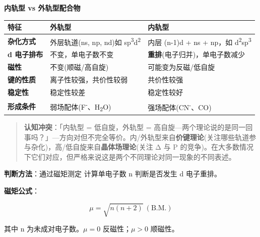 \textbf{内轨型 vs 外轨型配合物}

{\def\LTcaptype{none} %
\begin{longtable}[]{@{}
  >{\raggedright\arraybackslash}p{}
  >{\raggedright\arraybackslash}p{}
  >{\raggedright\arraybackslash}p{}@{}}
\toprule\noalign{}
\begin{minipage}[b]{\linewidth}\raggedright
特征
\end{minipage} & \begin{minipage}[b]{\linewidth}\raggedright
外轨型
\end{minipage} & \begin{minipage}[b]{\linewidth}\raggedright
内轨型
\end{minipage} \\
\midrule\noalign{}
\endhead
\bottomrule\noalign{}
\endlastfoot
\textbf{杂化方式} & 外层轨道(ns, np, nd)如 sp\textsuperscript{3}d\textsuperscript{2} & 内层 (n-1)d + ns + np，如 d\textsuperscript{2}sp\textsuperscript{3} \\
\textbf{d 电子排布} & 不变，单电子数不变 & \textbf{重排}(电子归并)，单电子数减少 \\
\textbf{磁性} & 不变(顺磁/高自旋) & 可能变为反磁/低自旋 \\
\textbf{键的性质} & 离子性较强，共价性较弱 & 共价性较强 \\
\textbf{稳定性} & 稳定性较差 & 稳定性较好 \\
\textbf{形成条件} & 弱场配体(F\textsuperscript{-}、H\textsubscript{2}O) & 强场配体(CN\textsuperscript{-}、CO) \\
\end{longtable}
}

\begin{quote}
\textbf{认知冲突}：「内轨型 = 低自旋，外轨型 = 高自旋---两个理论说的是同一回事吗？」---方向对但不完全等价。内/外轨型来自\textbf{价键理论}(关注哪些轨道参与杂化)，高/低自旋来自\textbf{晶体场理论}(关注 Δ 与 P 的竞争)。在大多数情况下它们对应，但严格来说这是两个不同理论对同一现象的不同表述。
\end{quote}

\textbf{判断方法}：通过磁矩测定 \箭 计算单电子数 n \箭 判断是否发生 d 电子重排。

\textbf{磁矩公式}：

\[
\mu = \sqrt{n(n+2)}\ (\text{B.M.})
\]

其中 n 为未成对电子数。\(\mu = 0\) \箭 反磁性；\(\mu > 0\) \箭 顺磁性。

